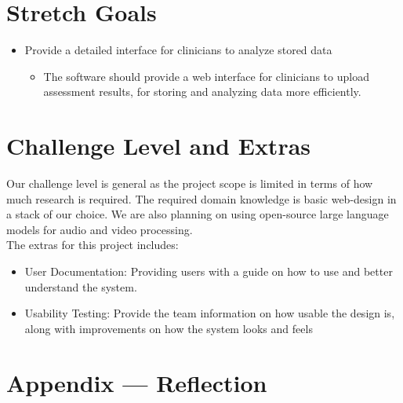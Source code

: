 \documentclass{article}
\begin{document}
\section{Stretch Goals}
\begin{itemize}
    \item Provide a detailed interface for clinicians to analyze stored data
    \begin{itemize}
        \item The software should provide a web interface for clinicians to upload assessment results, for storing and analyzing data more efficiently.
    \end{itemize}
\end{itemize}


\section{Challenge Level and Extras}

Our challenge level is general as the project scope is limited in terms of how much research is required. The required domain knowledge
is basic web-design in a stack of our choice. We are also planning on using open-source large language models for audio and video processing.\\
\indent The extras for this project includes:
\begin{itemize}
    \item User Documentation: Providing users with a guide on how to use and better understand the system.
    \item Usability Testing: Provide the team information on how usable the design is, along with improvements on how the system looks and feels
\end{itemize}

\newpage{}

\section*{Appendix --- Reflection}


\end{document}
